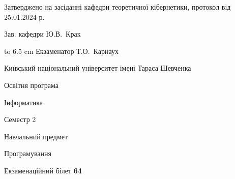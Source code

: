 \documentclass[12pt, ukrainian]{article}
\begin{document}
{\smallskip\smallskip \begin {scriptsize} Затверджено на засіданні кафедри теоретичної кібернетики, протокол   від   25.01.2024 р.\par\smallskip\smallskip\smallskip\smallskip
{\parbox {6.5 cm} {Зав. кафедри \dotfill Ю.В.~Крак}}\hspace {0.7cm} {\hbox to 6.5 cm { Екзаменатор \dotfill Т.О.~Карнаух}} \end{scriptsize}}
\newpage
{{\begin {scriptsize}\par
{ \center  Київський національний університет імені Тараса Шевченка \par}
{\parbox {5 cm}{Освітня програма \hfill}{\parbox {7 cm}{Інформатика\hfill}}\parbox {6 cm}{\hfill Семестр 2}}\par
{\parbox {5 cm} {Навчальний предмет \hfill}\parbox {7 cm}{Програмування \hfill}\parbox {6cm}{\hfill}\par}\vspace{-15pt} \end{scriptsize}}{\center Екзаменаційний білет \No \textbf { 64 }\par}}
\end{document}
